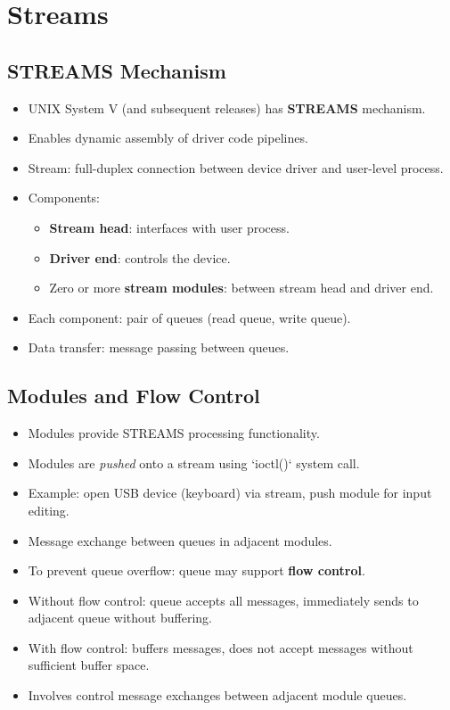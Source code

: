 \section{Streams}

\subsection{STREAMS Mechanism}
\begin{itemize}
    \item UNIX System V (and subsequent releases) has \textbf{STREAMS} mechanism.
    \item Enables dynamic assembly of driver code pipelines.
    \item Stream: full-duplex connection between device driver and user-level process.
    \item Components:
    \begin{itemize}
        \item \textbf{Stream head}: interfaces with user process.
        \item \textbf{Driver end}: controls the device.
        \item Zero or more \textbf{stream modules}: between stream head and driver end.
    \end{itemize}
    \item Each component: pair of queues (read queue, write queue).
    \item Data transfer: message passing between queues.
\end{itemize}

\subsection{Modules and Flow Control}
\begin{itemize}
    \item Modules provide STREAMS processing functionality.
    \item Modules are \textit{pushed} onto a stream using `ioctl()` system call.
    \item Example: open USB device (keyboard) via stream, push module for input editing.
    \item Message exchange between queues in adjacent modules.
    \item To prevent queue overflow: queue may support \textbf{flow control}.
    \item Without flow control: queue accepts all messages, immediately sends to adjacent queue without buffering.
    \item With flow control: buffers messages, does not accept messages without sufficient buffer space.
    \item Involves control message exchanges between adjacent module queues.
\end{itemize}

